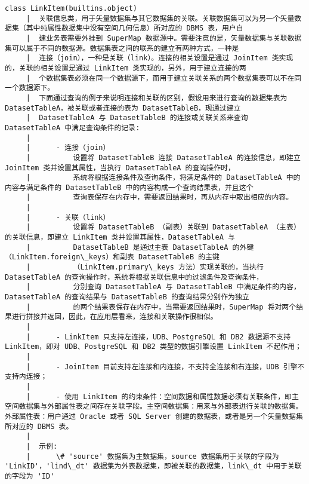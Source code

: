 \documentclass[11pt]{article}
\begin{document}
\begin{Verbatim}[commandchars=\\\{\}]
    class LinkItem(builtins.object)
     |  关联信息类，用于矢量数据集与其它数据集的关联。关联数据集可以为另一个矢量数据集（其中纯属性数据集中没有空间几何信息）所对应的 DBMS 表，用户自
     |  建业务表需要外挂到 SuperMap 数据源中。需要注意的是，矢量数据集与关联数据集可以属于不同的数据源。数据集表之间的联系的建立有两种方式，一种是
     |  连接（join），一种是关联（link）。连接的相关设置是通过 JoinItem 类实现的，关联的相关设置是通过 LinkItem 类实现的，另外，用于建立连接的两
     |  个数据集表必须在同一个数据源下，而用于建立关联关系的两个数据集表可以不在同一个数据源下。
     |  下面通过查询的例子来说明连接和关联的区别，假设用来进行查询的数据集表为 DatasetTableA，被关联或者连接的表为 DatasetTableB，现通过建立
     |  DatasetTableA 与 DatasetTableB 的连接或关联关系来查询 DatasetTableA 中满足查询条件的记录:
     |  
     |      - 连接（join）
     |          设置将 DatasetTableB 连接 DatasetTableA 的连接信息，即建立 JoinItem 类并设置其属性，当执行 DatasetTableA 的查询操作时，
     |          系统将根据连接条件及查询条件，将满足条件的 DatasetTableA 中的内容与满足条件的 DatasetTableB 中的内容构成一个查询结果表，并且这个
     |          查询表保存在内存中，需要返回结果时，再从内存中取出相应的内容。
     |  
     |      - 关联（link）
     |          设置将 DatasetTableB （副表）关联到 DatasetTableA （主表）的关联信息，即建立 LinkItem 类并设置其属性，DatasetTableA 与
     |          DatasetTableB 是通过主表 DatasetTableA 的外键（LinkItem.foreign\_keys）和副表 DatasetTableB 的主键
     |          （LinkItem.primary\_keys 方法）实现关联的，当执行 DatasetTableA 的查询操作时，系统将根据关联信息中的过滤条件及查询条件，
     |          分别查询 DatasetTableA 与 DatasetTableB 中满足条件的内容，DatasetTableA 的查询结果与 DatasetTableB 的查询结果分别作为独立
     |          的两个结果表保存在内存中，当需要返回结果时，SuperMap 将对两个结果进行拼接并返回，因此，在应用层看来，连接和关联操作很相似。
     |  
     |      - LinkItem 只支持左连接，UDB、PostgreSQL 和 DB2 数据源不支持 LinkItem，即对 UDB、PostgreSQL 和 DB2 类型的数据引擎设置 LinkItem 不起作用；
     |  
     |      - JoinItem 目前支持左连接和内连接，不支持全连接和右连接，UDB 引擎不支持内连接；
     |  
     |      - 使用 LinkItem 的约束条件：空间数据和属性数据必须有关联条件，即主空间数据集与外部属性表之间存在关联字段。主空间数据集：用来与外部表进行关联的数据集。外部属性表：用户通过 Oracle 或者 SQL Server 创建的数据表，或者是另一个矢量数据集所对应的 DBMS 表。
     |  
     |  示例:
     |      \# 'source' 数据集为主数据集，source 数据集用于关联的字段为 'LinkID'，'lind\_dt' 数据集为外表数据集，即被关联的数据集，link\_dt 中用于关联的字段为 'ID'

\end{Verbatim}
\end{document}

